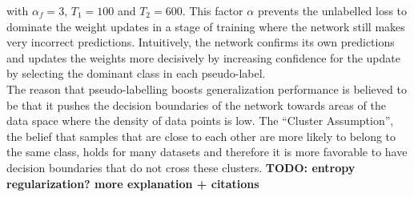 \noindent with $\alpha_f = 3$, $T_1 = 100$ and $T_2 = 600$. This factor $\alpha$ prevents the unlabelled loss to dominate the weight updates in a stage of training where the network still makes very incorrect predictions. Intuitively, the network confirms its own predictions and updates the weights more decisively by increasing confidence for the update by selecting the dominant class in each pseudo-label.\\

The reason that pseudo-labelling boosts generalization performance is believed to be that it pushes the decision boundaries of the network towards areas of the data space where the density of data points is low. The ``Cluster Assumption'', the belief that samples that are close to each other are more likely to belong to the same class, holds for many datasets and therefore it is more favorable to have decision boundaries that do not cross these clusters. \textbf{TODO: entropy regularization? more explanation + citations}